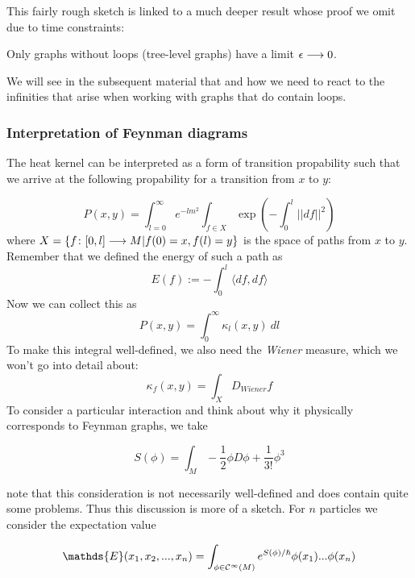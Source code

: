 This fairly rough sketch is linked to a much deeper result whose proof we omit due to time constraints:

\begin{fact}
  Only graphs without loops (tree-level graphs) have a limit $\epsilon \lra 0$.
\end{fact}

We will see in the subsequent material that and how we need to react to the infinities that arise when working with graphs that do contain loops.


\subsubsection{Interpretation of Feynman diagrams}
\label{subsubsec:feynman_intepretation}

The heat kernel can be interpreted as a form of transition propability such that we arrive at the following propability for a transition from $x$ to $y$:

\begin{equation} P(x,y) = \int_{l=0}^\infty e^{-lm^2} \int_{f\in X}  \exp\left( - \int_0^l ||df||^2 \right)\end{equation}
where $X = \{f \colon [0,l] \longrightarrow M | f(0) = x, f(l) = y \}$ is the space of paths from $x$ to $y$. Remember that we defined the energy of such a path as
\begin{equation} E(f) := - \int_0^l \langle df, df \rangle\end{equation}
Now we can collect this as
\begin{equation} P(x,y) = \int_0^\infty \kappa_l(x,y) \ dl\end{equation}
To make this integral well-defined, we also need the \emph{Wiener} measure, which we won't go into detail about:
\begin{equation} \kappa_f (x,y) = \int_X D_{Wiener} f\end{equation}
To consider a particular interaction and think about why it physically corresponds to Feynman graphs, we take

\begin{equation} S(\phi) = \int_M - \frac{1}{2} \phi D\phi + \frac{1}{3!} \phi^3\end{equation}

note that this consideration is not necessarily well-defined and does contain quite some problems. Thus this discussion is more of a sketch. For $n$ particles we consider the expectation value

\begin{equation} \mathds{E}(x_1, x_2, ..., x_n) = \int_{\phi \in \Ci(M)} e^{S(\phi)/\hbar} \phi(x_1) ... \phi(x_n)\end{equation}

